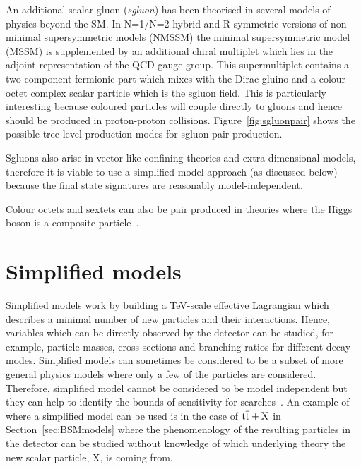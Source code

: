 An additional scalar gluon (\emph{sgluon}) has been theorised in several models of physics beyond the SM. In N=1/N=2 hybrid and R-symmetric versions of non-minimal supersymmetric models (NMSSM) the minimal supersymmetric model (MSSM) is supplemented by an additional chiral multiplet which lies in the adjoint representation of the QCD gauge group. This supermultiplet contains a two-component fermionic part which mixes with the Dirac gluino and a colour-octet complex scalar particle which is the sgluon field. This is particularly interesting because coloured particles will couple directly to gluons and hence should be produced in proton-proton collisions. Figure~\ref{fig:sgluonpair} shows the possible tree level production modes for sgluon pair production.~\cite{Calvet:2012rk}

Sgluons also arise in vector-like confining theories and extra-dimensional models, therefore it is viable to use a simplified model approach (as discussed below) because the final state signatures are reasonably model-independent.

Colour octets and sextets can also be pair produced in theories where the Higgs boson is a composite particle~\cite{Cacciapaglia2015}.



\section{Simplified models}

Simplified models work by building a TeV-scale effective Lagrangian which describes a minimal number of new particles and their interactions. Hence, variables which can be directly observed by the detector can be studied, for example, particle masses, cross sections and branching ratios for different decay modes. Simplified models can sometimes be considered to be a subset of more general physics models where only a few of the particles are considered. Therefore, simplified model cannot be considered to be model independent but they can help to identify the bounds of sensitivity for searches~\cite{0954-3899-39-10-105005}. An example of where a simplified model can be used is in the case of $\mathrm{t}\overline{\mathrm{t}}+\textrm{X}$ in Section~\ref{sec:BSMmodels} where the phenomenology of the resulting particles in the detector can be studied without knowledge of which underlying theory the new scalar particle, X, is coming from.


